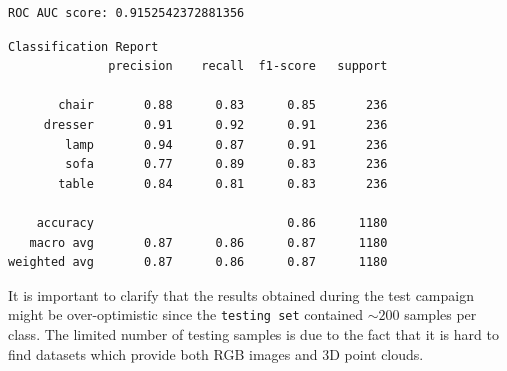 \documentclass[11pt,a4paper]{article}
\begin{document}
\begin{lstlisting}[language=bash,frame=single]
ROC AUC score: 0.9152542372881356
\end{lstlisting}
\begin{lstlisting}[language=bash,frame=single]
Classification Report
              precision    recall  f1-score   support

       chair       0.88      0.83      0.85       236
     dresser       0.91      0.92      0.91       236
        lamp       0.94      0.87      0.91       236
        sofa       0.77      0.89      0.83       236
       table       0.84      0.81      0.83       236

    accuracy                           0.86      1180
   macro avg       0.87      0.86      0.87      1180
weighted avg       0.87      0.86      0.87      1180
\end{lstlisting}
It is important to clarify that the results obtained during the test campaign might be over-optimistic since the \texttt{testing set} contained $\sim 200$ samples per class. The limited number of testing samples is due to the fact that it is hard to find datasets which provide both RGB images and 3D point clouds.

\newpage
\nocite{kerasiopointnet}
\nocite{towardsdatasciencepointnet}
\nocite{mediumcomkfoldcrossvalidation}
\printbibliography
\end{document}
